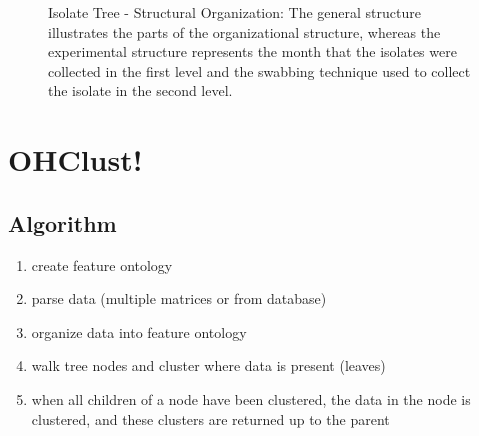 \documentclass[12pt]{ucthesis}
\begin{document}
      \begin{figure}[H]
      \centering
      \caption{Isolate Tree - Structural Organization: The general structure
               illustrates the parts of the organizational structure, whereas
               the experimental structure represents the month that the
               isolates were collected in the first level and the swabbing
               technique used to collect the isolate in the second level.}
      \label{fig:ontology_structure}
      \end{figure}


   \section{OHClust!}\label{sec:ohclust}
      \subsection{Algorithm}
         \begin{enumerate}
            \item create feature ontology
            \item parse data (multiple matrices or from database)
            \item organize data into feature ontology
            \item walk tree nodes and cluster where data is present (leaves)
            \item when all children of a node have been clustered, the data in the
                  node is clustered, and these clusters are returned up to the
                  parent
         \end{enumerate}
\end{document}
